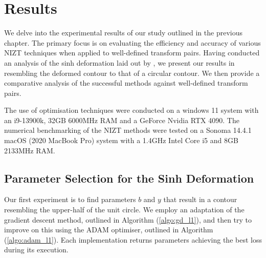 \documentclass[a4paper]{report}
\begin{document}
\chapter{Results}
We delve into the experimental results of our study outlined in the previous chapter. The primary focus is on evaluating the efficiency and accuracy of various NIZT techniques when applied to well-defined transform pairs. Having conducted an analysis of the sinh deformation laid out by \citet{levendorskii2022sinh}, we present our results in resembling the deformed contour to that of a circular contour. We then provide a comparative analysis of the successful methods against well-defined transform pairs.

The use of optimisation techniques were conducted on a windows 11 system with an i9-13900k, 32GB 6000MHz RAM and a GeForce Nvidia RTX 4090. The numerical benchmarking of the NIZT methods were tested on a Sonoma 14.4.1 macOS (2020 MacBook Pro) system with a 1.4GHz Intel Core i5 and 8GB 2133MHz RAM.

\section{Parameter Selection for the Sinh Deformation}
Our first experiment is to find parameters $b$ and $y$ that result in a contour resembling the upper-half of the unit circle. We employ an adaptation of the gradient descent method, outlined in Algorithm (\ref{algo:gd_l1}), and then try to improve on this using the ADAM optimiser, outlined in Algorithm (\ref{algo:adam_l1}). Each implementation returns parameters achieving the best loss during its execution.

\end{document}
